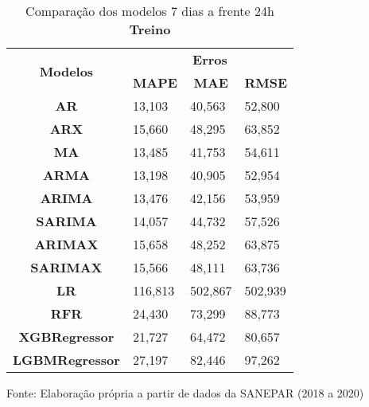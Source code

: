 \begin{table}[H]
	\centering
	\caption{Comparação dos modelos 7 dias a frente 24h \textbf{Treino} }\label{tb:10-24trn}
	\begin{tabular}{@{}clll@{}}
		\toprule
		\multirow{2}{*}{\textbf{Modelos}} & \multicolumn{3}{c}{\textbf{Erros}}                                                                       \\ \cmidrule(l){2-4} 
		& \multicolumn{1}{c}{\textbf{MAPE}} & \multicolumn{1}{c}{\textbf{MAE}} & \multicolumn{1}{c}{\textbf{RMSE}} \\ \hline
\textbf{AR}                       & 13,103                            & 40,563                           & 52,800                            \\
\textbf{ARX}                      & 15,660                            & 48,295                           & 63,852                            \\
\textbf{MA}                       & 13,485                            & 41,753                           & 54,611                            \\
\textbf{ARMA}                     & 13,198                            & 40,905                           & 52,954                            \\
\textbf{ARIMA}                    & 13,476                            & 42,156                           & 53,959                            \\
\textbf{SARIMA}                   & 14,057                            & 44,732                           & 57,526                            \\
\textbf{ARIMAX}                   & 15,658                            & 48,252                           & 63,875                            \\
\textbf{SARIMAX}                  & 15,566                            & 48,111                           & 63,736                            \\
\textbf{LR}        & 116,813                           & 502,867                          & 502,939                           \\
\textbf{RFR}  & 24,430                            & 73,299                           & 88,773                            \\
\textbf{XGBRegressor}             & 21,727                            & 64,472                           & 80,657                            \\
\textbf{LGBMRegressor}            & 27,197                            & 82,446                           & 97,262                            \\ \bottomrule
	\end{tabular}

Fonte: Elaboração própria a partir de dados da SANEPAR (2018 a 2020)
\end{table}

